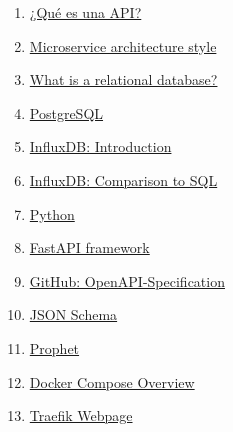 \documentclass[a4paper, oneside, 12pt]{book}
\begin{document}
	\begin{enumerate}
		\item
		\label{bib: what is api}
		\href{https://aws.amazon.com/es/what-is/api/}{¿Qué es una API?}
		
		\item
		\label{bib: microservices}
		\href{https://learn.microsoft.com/en-us/azure/architecture/guide/architecture-styles/microservices}{Microservice architecture style}
		
		
		\item
		\label{bib: relational database}
		\href{https://cloud.google.com/learn/what-is-a-relational-database}{What is a relational database?}
		
		
		\item
		\label{bib: postgresql}
		\href{https://www.postgresql.org/}{PostgreSQL}
		
		\item
		\label{bib: influxdb doc}
		\href{https://www.stackhero.io/en/services/InfluxDB/documentations/Introduction#differences-between-influxdb-and-relational-sql-databases}{InfluxDB: Introduction}
		
		\item
		\label{bib: influxdb doc vs sql}
		\href{https://archive.docs.influxdata.com/influxdb/v1.2/concepts/crosswalk/}{InfluxDB: Comparison to SQL}
		
		\item
		\label{bib: python doc}
		\href{https://www.python.org/}{Python}
		
		\item
		\label{bib: fastapi doc}
		\href{https://fastapi.tiangolo.com/}{FastAPI framework}
		
		\item
		\label{bib: openapi}
		\href{https://github.com/OAI/OpenAPI-Specification}{GitHub: OpenAPI-Specification}
		
		\item
		\label{bib: json schema}
		\href{https://json-schema.org/}{JSON Schema}
		
		\item
		\label{bib: prophet doc}
		\href{https://facebook.github.io/prophet/}{Prophet}
		
		\item
		\label{bib: docker compose doc}
		\href{https://docs.docker.com/compose/}{Docker Compose Overview}
		
		\item
		\label{bib: traefik webpage}
		\href{https://traefik.io/traefik/}{Traefik Webpage}
		

\end{enumerate}
\end{document}
